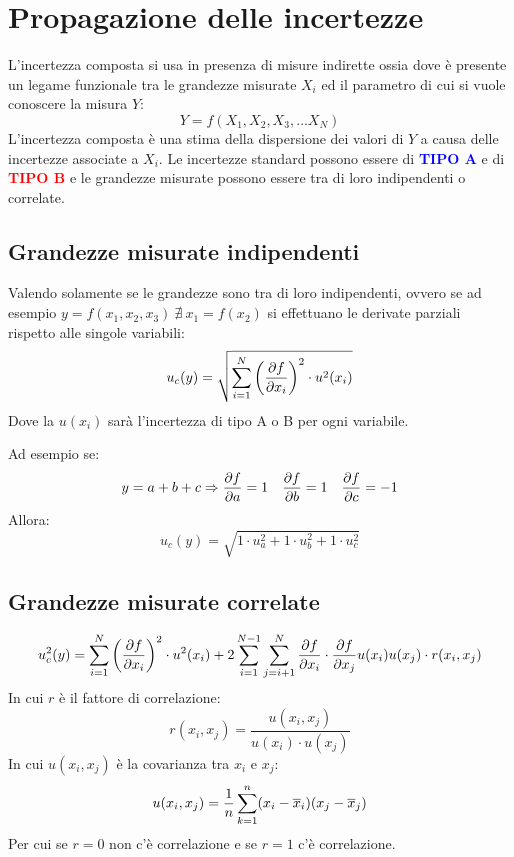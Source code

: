 \documentclass[a4paper, 15pt]{article}
\begin{document}
\section{Propagazione delle incertezze}
\begin{adjustwidth}{2in}{}    		
  		L’incertezza composta si usa in presenza di misure indirette ossia dove è presente
  		un legame funzionale tra le grandezze misurate $X_i$ ed il parametro di cui si
  		vuole conoscere la misura $Y$:
  		\[Y = f(X_1, X_2, X_3, \dots X_N)\]
  		L’incertezza composta è una stima della dispersione dei valori di $ Y $ a causa
  		delle incertezze associate a $X_i$. Le incertezze standard possono essere di \textcolor{blue}{\textbf{TIPO A}} e di \textcolor{red}{\textbf{TIPO B}} e le grandezze misurate possono essere tra di loro indipendenti o correlate.  
\end{adjustwidth}
\subsection{Grandezze misurate indipendenti}
\begin{adjustwidth}{2in}{}   		
  		Valendo solamente se le grandezze sono tra di loro indipendenti, ovvero se ad esempio \( y=f(x_1, x_2, x_3) ~ \nexists ~ x_1 = f(x_2)\) si effettuano le derivate parziali rispetto alle singole variabili:
  		\[ u_c(y) = \sqrt{\sum_{i=1}^{N}\left(\partial f\over\partial x_i\right)^2\cdot u^2(x_i)}\]
  		Dove la $u(x_i)$ sarà l'incertezza di tipo A o B per ogni variabile.\newline 
  		
  		Ad esempio se:
  		\[y = a + b + c \Rightarrow {\partial f\over\partial a} = 1 \quad {\partial f\over\partial b} = 1 \quad {\partial f\over\partial c} = -1 \]
  		Allora:
  		\[u_c(y) = \sqrt{1\cdot u_a^2 + 1\cdot u_b^2 + 1\cdot u_c^2}\]
\end{adjustwidth}
\subsection{Grandezze misurate correlate}
\begin{adjustwidth}{2in}{}     		
  		\[ u^2_c(y) = \sum_{i=1}^{N}\left(\partial f\over\partial x_i\right)^2\cdot u^2(x_i) + 2\sum_{i=1}^{N-1}\sum_{j=i+1}^{N} {\partial f\over\partial x_i}\cdot{\partial f\over\partial x_j}u(x_i)u(x_j)\cdot r(x_i, x_j)\]
  		In cui $r$ è il fattore di correlazione: 
  		\[ r(x_i, x_j) = \dfrac{u(x_i, x_j)}{u(x_i)\cdot u(x_j)}\]
  		In cui $u(x_i, x_j)$ è la covarianza tra $x_i$ e $x_j$:
  		\[u(x_i, x_j) = {1\over n}\sum_{k=1}^{n}(x_i-\overline{x}_i)(x_j-\overline{x}_j)\]
  		Per cui se $r=0$ non c'è correlazione e se $r=1$ c'è correlazione.  
\end{adjustwidth}
\newpage
\end{document}
